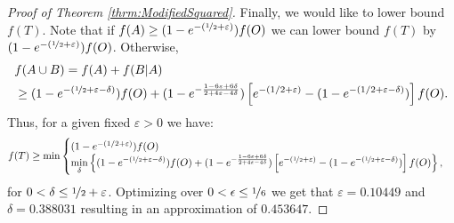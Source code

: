 \begin{proof}[Proof of Theorem \ref{thrm:ModifiedSquared}]
Finally, we would like to lower bound $f(T)$.
Note that if $f(A) \geq (1 - e^{-(\nicefrac[]{1}{2} + \varepsilon)})f(O)$ we can lower bound $f(T)$ by $(1 - e^{-(\nicefrac[]{1}{2} + \varepsilon)})f(O)$.
Otherwise,
\begin{align}
	&f(A \cup B)
	 = \nonumber
	f(A) + f(B|A)
	\\ & \geq
	(1-e^{-(\nicefrac[]{1}{2} + \varepsilon - \delta)})f(O)
	+
	(1-e^{-\frac{1-6\varepsilon+6\delta}{2+4\varepsilon-4\delta}})
	\left[
	e^{-(1/2 + \varepsilon)}
	- (1 - e^{-(1/2 + \varepsilon - \delta)})
	\right] f(O).
\end{align}
Thus, for a given fixed $\varepsilon > 0$ we have:
\begin{equation}
	f(T) \geq \min \begin{cases}
		(1 - e^{-(1/2 + \varepsilon)})f(O)
		\\
			\displaystyle{\min_{\delta}}\left\{
			(1-e^{-(\nicefrac[]{1}{2} + \varepsilon - \delta)})f(O)
			+
			(1-e^{-\frac{1-6\varepsilon+6\delta}{2+4\varepsilon-4\delta}})
			\left[
			e^{-(\nicefrac[]{1}{2} + \varepsilon)}
			- (1 - e^{-(\nicefrac[]{1}{2} + \varepsilon - \delta)})
			\right]f(O)\right\},
	\end{cases}
\end{equation}
for $0 < \delta \leq \nicefrac[]{1}{2} + \varepsilon$.
Optimizing over $0 < \epsilon \leq \nicefrac[]{1}{6}$ we get that $\varepsilon = 0.10449$ and $\delta = 0.388031$ resulting in an approximation of $0.453647$.
\end{proof}


